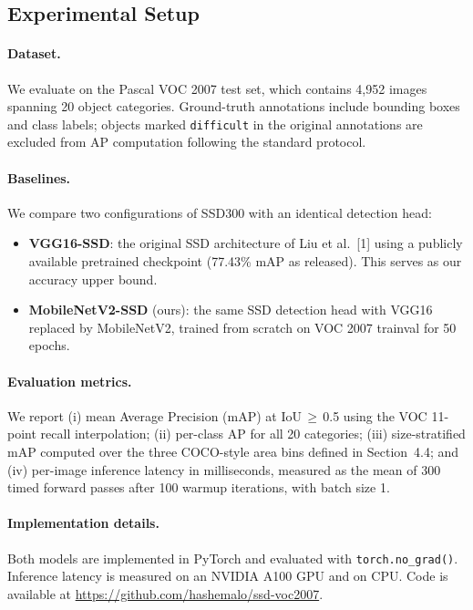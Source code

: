 \documentclass{article}
\begin{document}
\subsection{Experimental Setup}

\paragraph{Dataset.}
We evaluate on the Pascal VOC 2007 test set, which contains 4,952 images spanning 20 object categories. Ground-truth annotations include bounding boxes and class labels; objects marked \texttt{difficult} in the original annotations are excluded from AP computation following the standard protocol.

\paragraph{Baselines.}
We compare two configurations of SSD300 with an identical detection head:
\begin{itemize}
  \item \textbf{VGG16-SSD}: the original SSD architecture of Liu et al.\ [1] using a publicly available pretrained checkpoint (77.43\% mAP as released). This serves as our accuracy upper bound.
  \item \textbf{MobileNetV2-SSD} (ours): the same SSD detection head with VGG16 replaced by MobileNetV2, trained from scratch on VOC 2007 trainval for 50 epochs.
\end{itemize}

\paragraph{Evaluation metrics.}
We report (i) mean Average Precision (mAP) at IoU\,$\geq$\,0.5 using the VOC 11-point recall interpolation; (ii) per-class AP for all 20 categories; (iii) size-stratified mAP computed over the three COCO-style area bins defined in Section~4.4; and (iv) per-image inference latency in milliseconds, measured as the mean of 300 timed forward passes after 100 warmup iterations, with batch size 1.

\paragraph{Implementation details.}
Both models are implemented in PyTorch and evaluated with \texttt{torch.no\_grad()}. Inference latency is measured on an NVIDIA A100 GPU and on CPU. Code is available at \url{https://github.com/hashemalo/ssd-voc2007}.
\end{document}
